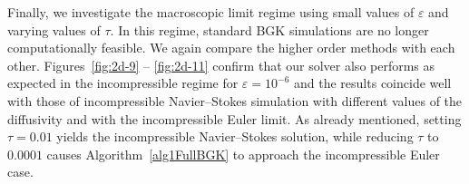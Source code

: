 \documentclass[final,11pt]{siamart251216}
\numberwithin{equation}{section}
\theoremstyle{definition}
\theoremstyle{remark}
\begin{document}
Finally, we investigate the macroscopic limit regime using small values of $\varepsilon$ and varying values of $\tau$.
In this regime, standard BGK simulations are no longer computationally feasible. We again compare the higher order methods with each other. Figures~\eqref{fig:2d-9} -- \eqref{fig:2d-11} confirm that our solver also performs as expected in the incompressible regime for $\varepsilon = 10^{-6}$ and the results coincide well with those of incompressible Navier--Stokes simulation with different values of the diffusivity and with the incompressible Euler limit. As already mentioned, setting $\tau = 0.01$ yields the incompressible Navier--Stokes solution, while reducing $\tau$ to $0.0001$ causes Algorithm~\ref{alg1FullBGK} to approach the incompressible Euler case. 
%
%
%
%
%
\end{document}
